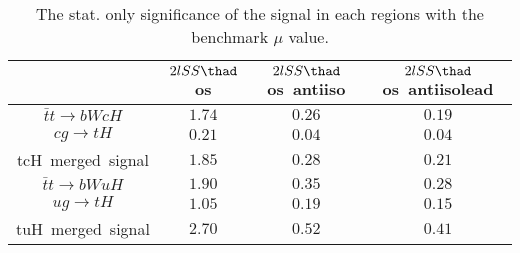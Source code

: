 \begin{table}
\footnotesize
\caption{The stat. only significance of the signal in each regions with the benchmark $\mu$ value.}
\centering
\begin{tabular}{|c|c|c|c|} \hline
 & $2lSS\thad$ os & $2lSS\thad$ os~antiiso & $2lSS\thad$ os~antiisolead\\\hline
$\bar{t}t\to bWcH$ & $1.74$ & $0.26$ & $0.19$\\\hline
$cg\to tH$ & $0.21$ & $0.04$ & $0.04$\\\hline
tcH~merged~signal & $1.85$ & $0.28$ & $0.21$\\\hline
$\bar{t}t\to bWuH$ & $1.90$ & $0.35$ & $0.28$\\\hline
$ug\to tH$ & $1.05$ & $0.19$ & $0.15$\\\hline
tuH~merged~signal & $2.70$ & $0.52$ & $0.41$\\\hline
\end{tabular}
\label{tab:significance}
\end{table}
